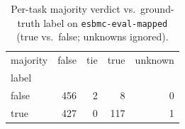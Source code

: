 \begin{table}[t]
  \centering
  \caption{Per-task majority verdict vs.\ ground-truth label on \texttt{esbmc-eval-mapped} (true vs.\ false; unknowns ignored).}
  \label{tab:majority-esbmc-eval-mapped}
\begin{tabular}{lrrrr}
\toprule
majority & false & tie & true & unknown \\
label &  &  &  &  \\
\midrule
false & 456 & 2 & 8 & 0 \\
true & 427 & 0 & 117 & 1 \\
\bottomrule
\end{tabular}
\end{table}
